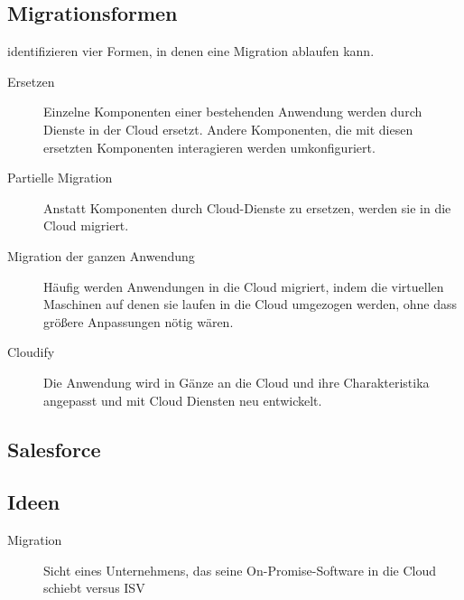\subsection{Migrationsformen}
 identifizieren vier Formen, in denen eine 
Migration ablaufen kann.
\begin{description}
	\item[Ersetzen] Einzelne Komponenten einer bestehenden Anwendung werden 
durch Dienste in der Cloud ersetzt. Andere Komponenten, die mit diesen 
ersetzten Komponenten interagieren werden umkonfiguriert.
	\item[Partielle Migration] Anstatt Komponenten durch Cloud-Dienste zu 
ersetzen, werden sie in die Cloud migriert.
	\item[Migration der ganzen Anwendung] Häufig werden Anwendungen in die 
Cloud migriert, indem die virtuellen Maschinen auf denen sie laufen in die 
Cloud umgezogen werden, ohne dass größere Anpassungen nötig wären.
	\item[Cloudify] Die Anwendung wird in Gänze an die Cloud und ihre 
Charakteristika angepasst und mit Cloud Diensten neu entwickelt.
\end{description}

\subsection{Salesforce}

\subsection{Ideen}
\begin{description}
	\item[Migration] Sicht eines Unternehmens, das seine 
On-Promise-Software in die Cloud schiebt versus ISV
\end{description}


